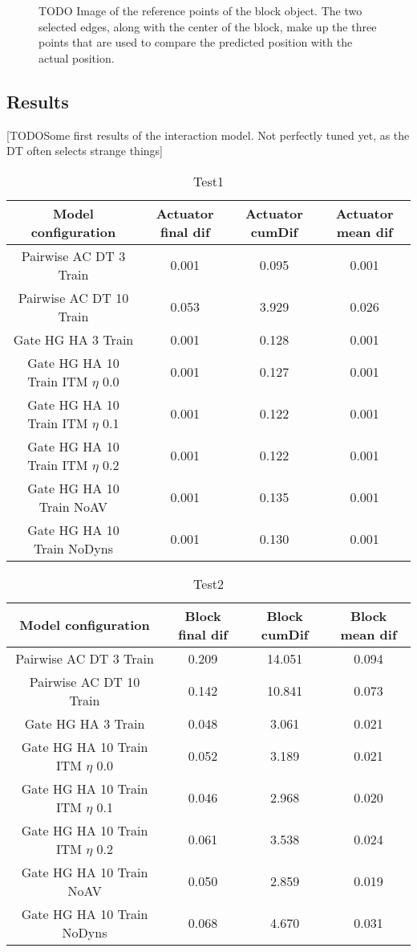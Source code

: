 \begin{figure}

\caption{TODO Image of the reference points of the block object. The two selected edges, along with the center of the block, make up the three points that are used
to compare the predicted position with the actual position.}
\label{fig:refPoints}
\end{figure}

\subsection{Results}
[TODOSome first results of the interaction model. Not perfectly tuned yet, as the DT often selects strange things]

\begin{table}
\begin{tabular}{|c|c|c|c|}
\hline Model configuration & Actuator final dif & Actuator cumDif & Actuator mean dif \\ 
\hline Pairwise AC DT 3 Train & 0.001 & 0.095 & 0.001  \\ 
\hline Pairwise AC DT 10 Train & 0.053 & 3.929 & 0.026  \\ 
\hline Gate HG HA 3 Train & 0.001 & 0.128 & 0.001 \\
\hline Gate HG HA 10 Train ITM $\eta$ 0.0 & 0.001 & 0.127 & 0.001 \\ 
\hline Gate HG HA 10 Train ITM $\eta$ 0.1 & 0.001 & 0.122 & 0.001 \\
\hline Gate HG HA 10 Train ITM $\eta$ 0.2 & 0.001 & 0.122 & 0.001 \\ 
\hline Gate HG HA 10 Train NoAV & 0.001 & 0.135 & 0.001 \\ 
\hline Gate HG HA 10 Train NoDyns & 0.001 & 0.130 & 0.001 \\ 
\hline 
\end{tabular} 
\caption{Test1}
\end{table}

\begin{table}
\begin{tabular}{|c|c|c|c|}
\hline Model configuration & Block final dif & Block cumDif & Block mean dif \\ 
\hline Pairwise AC DT 3 Train & 0.209 & 14.051 & 0.094  \\ 
\hline Pairwise AC DT 10 Train & 0.142 & 10.841 & 0.073  \\
\hline Gate HG HA 3 Train & 0.048 & 3.061 & 0.021 \\ 
\hline Gate HG HA 10 Train ITM $\eta$ 0.0 & 0.052 & 3.189 & 0.021 \\ 
\hline Gate HG HA 10 Train ITM $\eta$ 0.1 & 0.046 & 2.968 & 0.020 \\ 
\hline Gate HG HA 10 Train ITM $\eta$ 0.2 & 0.061 & 3.538 & 0.024 \\ 
\hline Gate HG HA 10 Train NoAV & 0.050 & 2.859 & 0.019 \\ 
\hline Gate HG HA 10 Train NoDyns & 0.068 & 4.670 & 0.031 \\ 
\hline 
\end{tabular} 
\caption{Test2}
\end{table}

